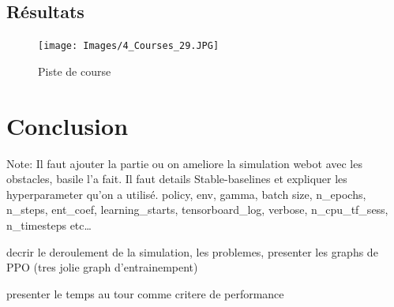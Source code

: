 \documentclass[french]{article}
\begin{document}
\subsection{Résultats}


\begin{figure}[H]
    \centering
    \texttt{[image: Images/4\_Courses\_29.JPG]}
    \caption{Piste de course}
\end{figure}
    



\section{Conclusion}

Note:
Il faut ajouter la partie ou on ameliore la simulation webot avec les obstacles, basile l'a fait.
Il faut details Stable-baselines et expliquer les hyperparameter qu'on a utilisé.
policy, env, gamma, batch size, n\_epochs, n\_steps, ent\_coef, learning\_starts, tensorboard\_log, verbose, 
n\_cpu\_tf\_sess, n\_timesteps etc\dots

decrir le deroulement de la simulation, les problemes, presenter les graphs
de PPO (tres jolie graph d'entrainempent)

presenter le temps au tour comme critere de performance
\end{document}
